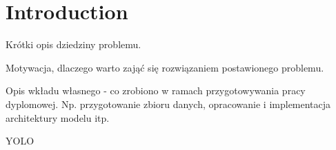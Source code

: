 \newpage %
\section{Introduction}

Krótki opis dziedziny problemu.

Motywacja, dlaczego warto zająć się rozwiązaniem postawionego problemu.

Opis wkładu własnego - co zrobiono w ramach przygotowywania pracy dyplomowej. 
Np. przygotowanie zbioru danych, opracowanie i implementacja architektury modelu itp.

YOLO~\cite{redmon2016you}